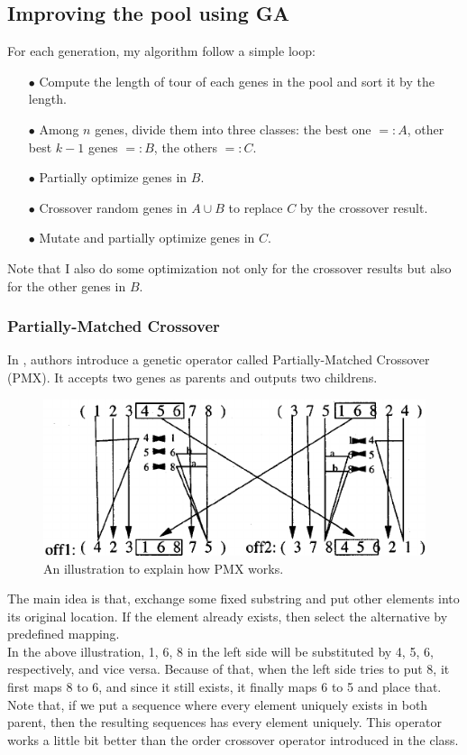 \documentclass[11pt]{article}
\begin{document}
\subsection{Improving the pool using GA} \label{ssec:2.2}
For each generation, my algorithm follow a simple loop:
\begin{itemize}
	\item[$\bullet$] Compute the length of tour of each genes in the pool and sort it by the length.
	\item[$\bullet$] Among $n$ genes, divide them into three classes: the best one $=:A$, other best $k-1$ genes $=:B$, the others $=:C$.
	\item[$\bullet$] Partially optimize genes in $B$.
	\item[$\bullet$] Crossover random genes in $A \cup B$ to replace $C$ by the crossover result.
	\item[$\bullet$] Mutate and partially optimize genes in $C$.
\end{itemize}
Note that I also do some optimization not only for the crossover results but also for the other genes in $B$.

\subsubsection{Partially-Matched Crossover} \label{sssec:2.2.1}
In \cite{GL85}, authors introduce a genetic operator called Partially-Matched Crossover (PMX). It accepts two genes as parents and outputs two childrens.
\begin{figure}[htb]
	\begin{center}
		\includegraphics[width=0.6\linewidth]{PMX.png}
	\end{center}
	\caption{An illustration to explain how PMX works.}
\end{figure}
The main idea is that, exchange some fixed substring and put other elements into its original location. If the element already exists, then select the alternative by predefined mapping. \\
In the above illustration, 1, 6, 8 in the left side will be substituted by 4, 5, 6, respectively, and vice versa. Because of that, when the left side tries to put 8, it first maps 8 to 6, and since it still exists, it finally maps 6 to 5 and place that.
Note that, if we put a sequence where every element uniquely exists in both parent, then the resulting sequences has every element uniquely. This operator works a little bit better than the order crossover operator introduced in the class.
\end{document}
